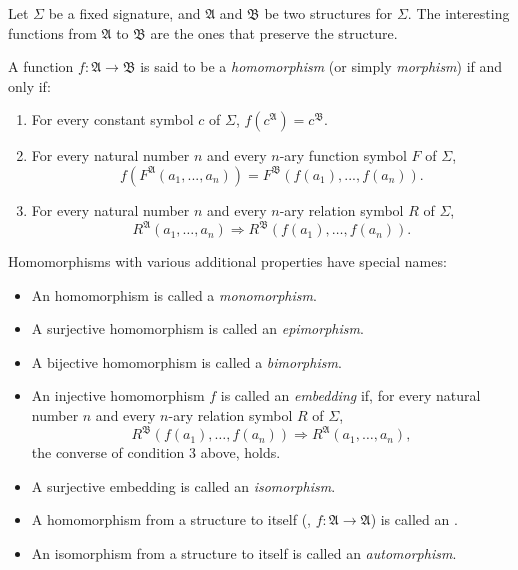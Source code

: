 \documentclass[12pt]{article}
\newcommand{\Implies}{\Rightarrow}
\newcommand{\A}{\mathfrak{A}}
\newcommand{\B}{\mathfrak{B}}
\begin{document}

Let $\Sigma$ be a fixed signature, and $\A$ and $\B$ be two structures for $\Sigma$.  The interesting functions from $\A$ to $\B$ are the ones that preserve the structure.

A function $f\colon \A \to \B$ is said to be a \emph{homomorphism} (or simply \emph{morphism}) if and only if:
\begin{enumerate}
 \item For every constant symbol $c$ of $\Sigma$, $f(c^\A)=c^\B$.
 \item For every natural number $n$ and every $n$-ary function symbol $F$ of
 $\Sigma$,
\[
f(F^\A(a_1,...,a_n))=F^\B(f(a_1),...,f(a_n)).
\]
 \item For every natural number $n$ and every $n$-ary relation symbol $R$
 of $\Sigma$,
\[
R^\A(a_1, \ldots ,a_n) \Implies R^\B(f(a_1), \ldots,f(a_n)).
\]
\end{enumerate}

Homomorphisms with various additional properties have special names:
\begin{itemize}
  \item An  homomorphism is called a \emph{monomorphism}.
  \item A surjective homomorphism is called an \emph{epimorphism}.
  \item A bijective homomorphism is called a \emph{bimorphism}.
  \item An injective homomorphism $f$ is called an \emph{embedding} if, for every natural number $n$ and every $n$-ary relation symbol $R$ of $\Sigma$,
\[
R^\B(f(a_1), \ldots,f(a_n)) \Implies R^\A(a_1, \ldots ,a_n),
\]
the converse of condition 3 above, holds.
  \item A surjective embedding is called an \emph{isomorphism}.
  \item A homomorphism from a structure to itself (, $f\colon \A \to \A$) is called an \emph{}.
  \item An isomorphism from a structure to itself is called an \emph{automorphism}.
\end{itemize}
\end{document}
